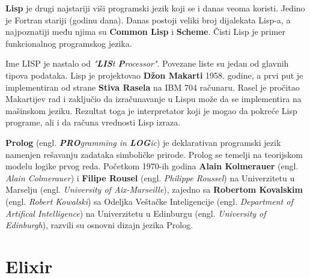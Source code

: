 \documentclass[12pt,oneside]{memoir}
\begin{document}
\textbf{Lisp} je drugi najstariji viši programski jezik koji se i danas veoma koristi. Jedino je Fortran stariji (godinu dana). Danas postoji veliki broj dijalekata Lisp-a, a najpoznatiji među njima su \textbf{Common Lisp} i \textbf{Scheme}. Čisti Lisp je primer funkcionalnog programskog jezika.
\begin{comment} U funkcionalnom programiranju, funkcije se primenjuju na argumente i vrednosti. Vraćene vrednosti se koriste kao argumenti za druge funkcije. Funkcionalno programiranje je suprotno proceduralnom programiranju, gde se koriste naredbe koje menjaju okruženje programa na neki način, kao što je pripisivanje vrednosti promenljivim. U funkcionalnom programiranju, te promene okruženja se minimizuju korišćenjem vrednosti koje vraća pozvana funkcija kao direktan ulaz u drugu funkciju, bez upotrebe pripisivanja naredbi.\\

\end{comment}
Ime LISP je nastalo od \textit{"\textbf{LIS}t \textbf{P}rocessor"}. Povezane liste su jedan od glavnih tipova podataka. Lisp je projektovao \textbf{Džon Makarti} 1958. godine, a prvi put je implementiran od strane \textbf{Stiva Rasela} na IBM 704 računaru. Rasel je pročitao Makartijev rad i zaključio da izračunavanje u Lispu može da se implementira na mašinskom jeziku. Rezultat toga je interpretator koji je mogao da pokreće Lisp programe, ali i da računa vrednosti Lisp izraza.

\textbf{Prolog} (engl. \textit{\textbf{PRO}gramming in \textbf{LOG}ic}) je deklarativan programski jezik namenjen rešavanju zadataka simboličke prirode. Prolog se temelji na teorijskom modelu logike prvog reda. Početkom 1970-ih godina \textbf{Alain Kolmerauer} (engl. \textit{Alain Colmerauer}) i \textbf{Filipe Rousel} (engl. \textit{Philippe Roussel}) na Univerzitetu u Marselju (engl. \textit{University of Aix-Marseille}), zajedno sa \textbf{Robertom Kovalskim} (engl. \textit{Robert Kowalski}) sa Odeljka Veštačke Inteligencije (engl. \textit{Department of Artifical Intelligence}) na Univerzitetu u Edinburgu (engl. \textit{University of Edinburgh}), razvili su osnovni dizajn jezika Prolog.

\section{Elixir}
\end{document}
